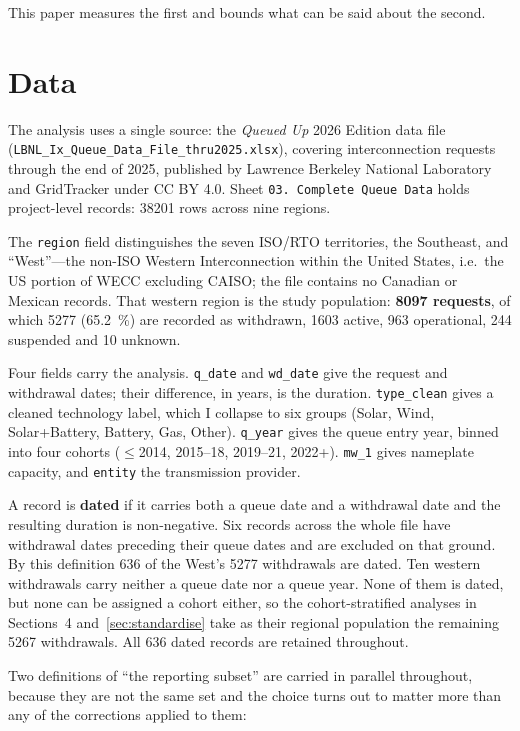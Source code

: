 \documentclass[11pt,a4paper]{article}
\begin{document}
This paper measures the first and bounds what can be said about the second.

\section{Data}

The analysis uses a single source: the \emph{Queued Up} 2026 Edition data file
(\texttt{LBNL\_Ix\_Queue\_Data\_File\_thru2025.xlsx}), covering interconnection
requests through the end of 2025, published by Lawrence Berkeley National
Laboratory and GridTracker under CC BY 4.0. Sheet \texttt{03. Complete Queue
Data} holds project-level records: \num{38201} rows across nine regions.

The \texttt{region} field distinguishes the seven ISO/RTO territories, the
Southeast, and ``West''---the non-ISO Western Interconnection within the United
States, i.e.\ the US portion of WECC excluding CAISO; the file contains no
Canadian or Mexican records. That western region is the study population:
\textbf{\num{8097} requests}, of which \num{5277} (\SI{65.2}{\percent}) are
recorded as withdrawn, \num{1603} active, 963 operational, 244 suspended and 10
unknown.

Four fields carry the analysis. \texttt{q\_date} and \texttt{wd\_date} give the
request and withdrawal dates; their difference, in years, is the duration.
\texttt{type\_clean} gives a cleaned technology label, which I collapse to six
groups (Solar, Wind, Solar+Battery, Battery, Gas, Other). \texttt{q\_year} gives
the queue entry year, binned into four cohorts ($\leq$2014, 2015--18, 2019--21,
2022+). \texttt{mw\_1} gives nameplate capacity, and \texttt{entity} the
transmission provider.

A record is \textbf{dated} if it carries both a queue date and a withdrawal date
and the resulting duration is non-negative. Six records across the whole file
have withdrawal dates preceding their queue dates and are excluded on that
ground. By this definition 636 of the West's \num{5277} withdrawals are dated.
Ten western withdrawals carry neither a queue date nor a queue year. None of them
is dated, but none can be assigned a cohort either, so the cohort-stratified
analyses in Sections~4 and~\ref{sec:standardise} take as their regional
population the remaining \num{5267} withdrawals. All 636 dated records are
retained throughout.

Two definitions of ``the reporting subset'' are carried in parallel throughout,
because they are not the same set and the choice turns out to matter more than
any of the corrections applied to them:
\end{document}

